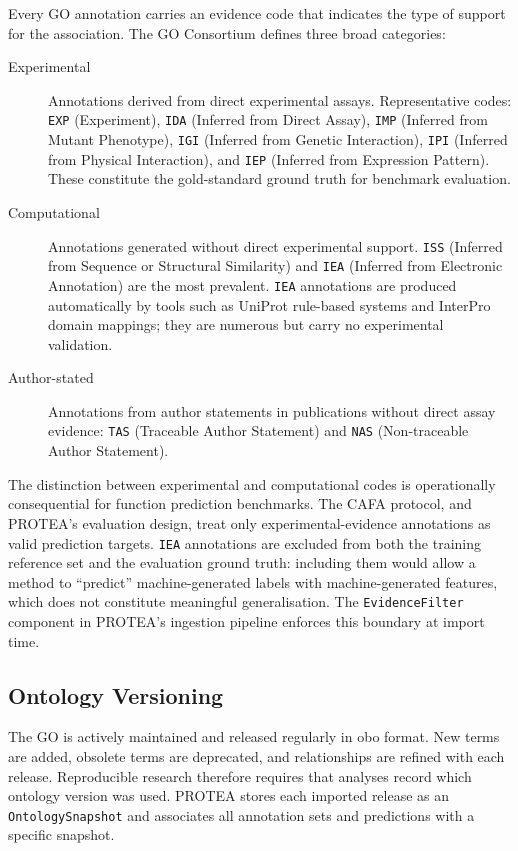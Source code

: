 Every GO annotation carries an evidence code that indicates the type of support
for the association. The GO Consortium defines three broad categories:

\begin{description}
  \item[Experimental] Annotations derived from direct experimental assays.
    Representative codes: \texttt{EXP} (Experiment), \texttt{IDA} (Inferred from
    Direct Assay), \texttt{IMP} (Inferred from Mutant Phenotype), \texttt{IGI}
    (Inferred from Genetic Interaction), \texttt{IPI} (Inferred from Physical
    Interaction), and \texttt{IEP} (Inferred from Expression Pattern). These
    constitute the gold-standard ground truth for benchmark evaluation.
  \item[Computational] Annotations generated without direct experimental support.
    \texttt{ISS} (Inferred from Sequence or Structural Similarity) and
    \texttt{IEA} (Inferred from Electronic Annotation) are the most prevalent.
    \texttt{IEA} annotations are produced automatically by tools such as
    UniProt rule-based systems and InterPro domain mappings; they are numerous
    but carry no experimental validation.
  \item[Author-stated] Annotations from author statements in publications without
    direct assay evidence: \texttt{TAS} (Traceable Author Statement) and
    \texttt{NAS} (Non-traceable Author Statement).
\end{description}

The distinction between experimental and computational codes is operationally
consequential for function prediction benchmarks. The CAFA protocol, and PROTEA's
evaluation design, treat only experimental-evidence annotations as valid prediction
targets. \texttt{IEA} annotations are excluded from both the training reference set
and the evaluation ground truth: including them would allow a method to ``predict''
machine-generated labels with machine-generated features, which does not constitute
meaningful generalisation. The \texttt{EvidenceFilter} component in PROTEA's
ingestion pipeline enforces this boundary at import time.

\subsection{Ontology Versioning}
\label{subsec:go-versioning}

The GO is actively maintained and released regularly in \gls{obo} format.
New terms are added, obsolete terms are deprecated, and relationships are
refined with each release. Reproducible research therefore requires that
analyses record which ontology version was used. PROTEA stores each imported
release as an \texttt{OntologySnapshot} and associates all annotation sets
and predictions with a specific snapshot.

